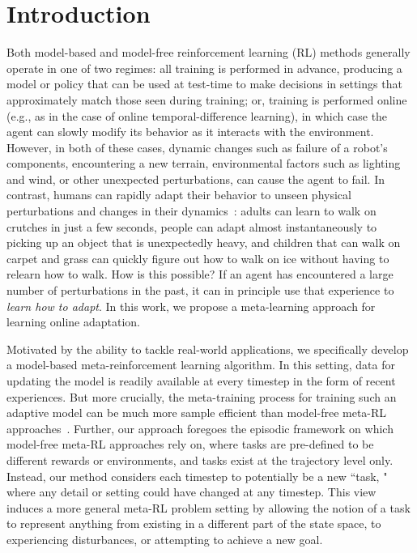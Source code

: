 \vspsec
\section{Introduction}
\vspsec
Both model-based and model-free reinforcement learning (RL) methods generally operate in one of two regimes: all training is performed in advance, producing a model or policy that can be used at test-time to make decisions in settings that approximately match those seen during training; or, training is performed online (e.g., as in the case of online temporal-difference learning), in which case the agent can slowly modify its behavior as it interacts with the environment. However, in both of these cases, dynamic changes such as failure of a robot's components, encountering a new terrain, environmental factors such as lighting and wind, or other unexpected perturbations, can cause the agent to fail. In contrast, humans can rapidly adapt their behavior to unseen physical perturbations and changes in their dynamics~\citep{braun2009learning}: adults can learn to walk on crutches in just a few seconds, people can adapt almost instantaneously to picking up an object that is unexpectedly heavy, and children that can walk on carpet and grass can quickly figure out how to walk on ice without having to relearn how to walk. How is this possible? If an agent has encountered a large number of perturbations in the past, it can in principle use that experience to \emph{learn how to adapt}. In this work, we
propose a meta-learning approach for learning online adaptation.

Motivated by the ability to tackle real-world applications, we specifically develop a model-based meta-reinforcement learning algorithm. In this setting, data for updating the model is readily available at every timestep in the form of recent experiences. But more crucially, the meta-training process for training such an adaptive model can be much more sample efficient than model-free meta-RL approaches~\citep{duan2016rl2,wang2016learning,finn2017maml}. Further, our approach foregoes the episodic framework on which model-free meta-RL approaches rely on, where tasks are pre-defined to be different rewards or environments, and tasks exist at the trajectory level only. Instead, our method considers each timestep to potentially be a new ``task, " where any detail or setting could have changed at any timestep. This view induces a more general meta-RL problem setting by allowing the notion of a task to represent anything from existing in a different part of the state space, to experiencing disturbances, or attempting to achieve a new goal.

